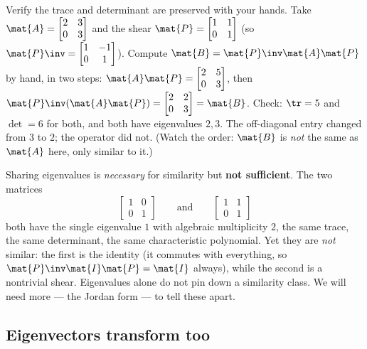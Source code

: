\begin{labbox}
Verify the trace and determinant are preserved with your hands. Take
$\mat{A}=\begin{bmatrix}2&3\\0&3\end{bmatrix}$ and the shear
$\mat{P}=\begin{bmatrix}1&1\\0&1\end{bmatrix}$ (so $\mat{P}\inv=\begin{bmatrix}1&-1\\0&1\end{bmatrix}$).
Compute $\mat{B}=\mat{P}\inv\mat{A}\mat{P}$ by hand, in two steps:
$\mat{A}\mat{P}=\begin{bmatrix}2&5\\0&3\end{bmatrix}$, then
$\mat{P}\inv(\mat{A}\mat{P})=\begin{bmatrix}2&2\\0&3\end{bmatrix}=\mat{B}$.
Check: $\tr=5$ and $\det=6$ for both, and both have eigenvalues $2,3$. The off-diagonal
entry changed from $3$ to $2$; the operator did not. (Watch the order: $\mat{B}$ is
\emph{not} the same as $\mat{A}$ here, only similar to it.)
\end{labbox}

\begin{trapbox}
Sharing eigenvalues is \emph{necessary} for similarity but \textbf{not sufficient}. The
two matrices
\[
\begin{bmatrix}1&0\\0&1\end{bmatrix}
\qquad\text{and}\qquad
\begin{bmatrix}1&1\\0&1\end{bmatrix}
\]
both have the single eigenvalue $1$ with algebraic multiplicity $2$, the same trace, the
same determinant, the same characteristic polynomial. Yet they are \emph{not} similar:
the first is the identity (it commutes with everything, so
$\mat{P}\inv\mat{I}\mat{P}=\mat{I}$ always), while the second is a nontrivial shear.
Eigenvalues alone do not pin down a similarity class. We will need more --- the Jordan
form --- to tell these apart.
\end{trapbox}

\subsection{Eigenvectors transform too}

